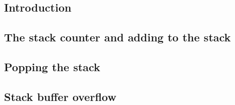 
\subsection{Introduction}

\subsection{The stack counter and adding to the stack}

\subsection{Popping the stack}

\subsection{Stack buffer overflow}



